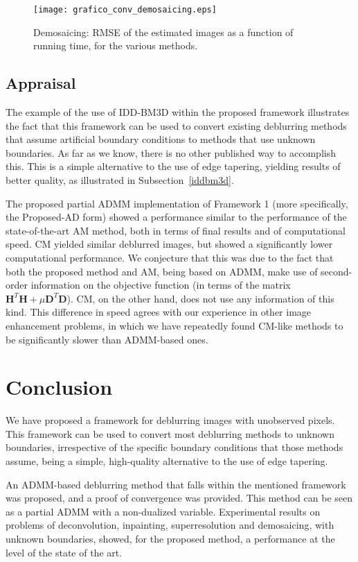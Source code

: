 \documentclass[10pt,twocolumn,twoside]{IEEEtran}
\newcommand{\Hm}{\mathbf{H}} %
\newcommand{\D}{\mathbf{D}} %
\begin{document}
\begin{figure}[!t]
	\centering
	\texttt{[image: grafico\_conv\_demosaicing.eps]}%
	\caption{Demosaicing: RMSE of the estimated images as a function of running time, for the various methods.}	
	\label{fig:grafico_conv_demosaicing}
\end{figure}

\subsection{Appraisal}
\label{sec:appraisal}

The example of the use of IDD-BM3D within the proposed framework illustrates the fact that this framework can be used to convert existing deblurring methods that assume artificial boundary conditions to methods that use unknown boundaries. As far as we know, there is no other published way to accomplish this. This is a simple alternative to the use of edge tapering, yielding results of better quality, as illustrated in Subsection~\ref{iddbm3d}.

The proposed partial ADMM implementation of Framework 1 (more specifically, the Proposed-AD form) showed a performance similar to the performance of the state-of-the-art AM method, both in terms of final results and of computational speed. CM yielded similar deblurred images, but showed a significantly lower computational performance. We conjecture that this was due to the fact that both the proposed method and AM, being based on ADMM, make use of second-order information on the objective function (in terms of the matrix $\Hm^T \Hm + \mu \D^T \D$). CM, on the other hand, does not use any information of this kind. This difference in speed agrees with our experience in other image enhancement problems, in which we have repeatedly found CM-like methods to be significantly slower than ADMM-based ones.

\section{Conclusion} \label{sec:conclusion}

We have proposed a framework for deblurring images with unobserved pixels. This framework can be used to convert most deblurring methods to unknown boundaries, irrespective of the specific boundary conditions that those methods assume, being a simple, high-quality alternative to the use of edge tapering.

 An ADMM-based deblurring method that falls within the mentioned framework was proposed, and a proof of convergence was provided. This method can be seen as a partial ADMM with a non-dualized variable. Experimental results on problems of deconvolution, inpainting, superresolution and demosaicing, with unknown boundaries, showed, for the proposed method, a performance at the level of the state of the art.
\end{document}
